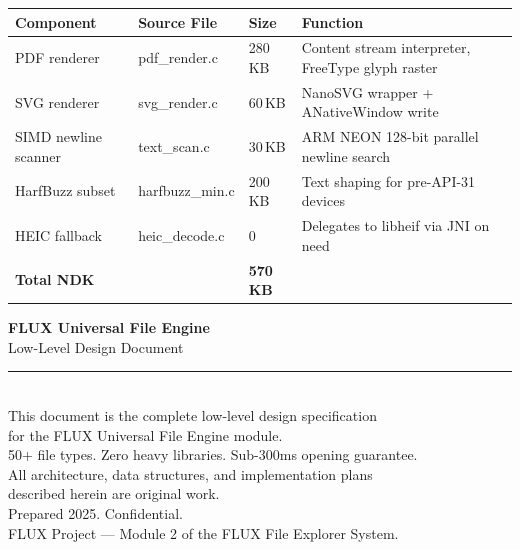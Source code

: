 \documentclass[11pt, a4paper, openright]{report}
\begin{document}
\begin{longtable}{@{}p{32mm}p{28mm}p{18mm}p{60mm}@{}}
\toprule
\textbf{Component} & \textbf{Source File} & \textbf{Size} & \textbf{Function} \\
\midrule
PDF renderer & pdf\_render.c & 280\,KB & Content stream interpreter, FreeType glyph raster \\
SVG renderer & svg\_render.c & 60\,KB & NanoSVG wrapper + ANativeWindow write \\
SIMD newline scanner & text\_scan.c & 30\,KB & ARM NEON 128-bit parallel newline search \\
HarfBuzz subset & harfbuzz\_min.c & 200\,KB & Text shaping for pre-API-31 devices \\
HEIC fallback & heic\_decode.c & 0 & Delegates to libheif via JNI on need \\
\midrule
\textbf{Total NDK} & & \textbf{570\,KB} & \\
\bottomrule
\end{longtable}

\newpage
\thispagestyle{plain}
\vspace*{55mm}

\begin{center}
{\Large\bfseries FLUX Universal File Engine}\\[6pt]
{\large Low-Level Design Document}\\[14pt]
\textcolor{rule}{\rule{80mm}{0.4pt}}\\[14pt]
{\small\textcolor{light}
This document is the complete low-level design specification\\
for the FLUX Universal File Engine module.\\[4pt]
50+ file types. Zero heavy libraries. Sub-300ms opening guarantee.\\[4pt]
All architecture, data structures, and implementation plans\\
described herein are original work.\\[14pt]
Prepared 2025. Confidential.\\[4pt]
FLUX Project --- Module 2 of the FLUX File Explorer System.
}
\end{center}
\end{document}
